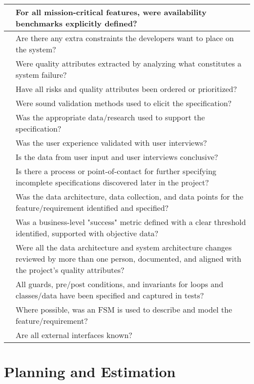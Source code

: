 \documentclass{article}
\begin{document}
\begin{center}
\begin{tabular}{ | p{.25cm} || p{10cm} |}
     & For all mission-critical features, were availability benchmarks explicitly defined? \\ \hline
     & Are there any extra constraints the developers want to place on the system? \\ \hline
     & Were quality attributes extracted by analyzing what constitutes a system failure? \\ \hline
     & Have all risks and quality attributes been ordered or prioritized? \\ \hline
     & Were sound validation methods used to elicit the specification? \\ \hline
     & Was the appropriate data/research used to support the specification? \\ \hline
     & Was the user experience validated with user interviews? \\ \hline
     & Is the data from user input and user interviews conclusive? \\ \hline
     & Is there a process or point-of-contact for further specifying incomplete specifications discovered later in the project? \\ \hline
     & Was the data architecture, data collection, and data points for the feature/requirement identified and specified? \\ \hline
     & Was a business-level "success" metric defined with a clear threshold identified, supported with objective data? \\ \hline
     & Were all the data architecture and system architecture changes reviewed by more than one person, documented, and aligned with the project's quality attributes? \\ \hline
     & All guards, pre/post conditions, and invariants for loops and classes/data have been specified and captured in tests? \\ \hline
     & Where possible, was an FSM is used to describe and model the feature/requirement? \\ \hline
     & Are all external interfaces known? \\ \hline
    \end{tabular}
\end{center}



\section{Planning and Estimation}
\end{document}
